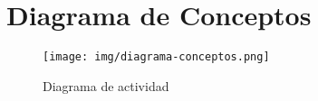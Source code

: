 \chapter{Diagrama de Conceptos}

\begin{figure}[!h]
  \centering
    \texttt{[image: img/diagrama-conceptos.png]}
    \caption{Diagrama de actividad}
\end{figure}